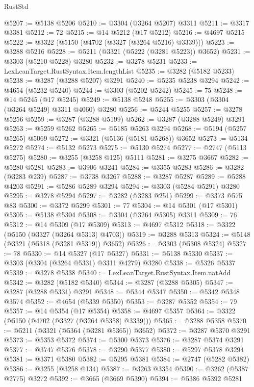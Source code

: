 \begin{lexlean}{RustStd}
\begin{coremodule}
{\begin{coremodule}
{{{{{{{{{{{{{{{{{{{{{{{{{{{{{{{{{@5207 := @5138 @5206
@5210 := @3304 (@3264 @5207) @3311
@5211 := @3317 @3381
@5212 := 72
@5215 := @14 @5212 (@17 @5212)
@5216 := @4697 @5215
@5222 := @3322 (@5150 (@4702 (@3327 (@3264 @5216) @3339)))
@5223 := @3288 @5216
@5228 := @5211 (@3321 (@5222 (@3281 @5223)) @3652)
@5231 := @3303 (@5210 @5228) @3280
@5232 := @3278 @5231
@5233 := LexLeanTarget.RustSyntax.Item.lengthList
@5235 := @3282 (@5182 @5233)
@5238 := @3287 (@3288 @5207) @3291
@5240 := @5235 @5238 @3294
@5242 := @4654 (@5232 @5240)
@5244 := @3303 (@5202 @5242)
@5245 := 75
@5248 := @14 @5245 (@17 @5245)
@5249 := @5138 @5248
@5255 := @3303 (@3304 (@3264 @5249) @3311 @4060) @3280
@5256 := @5244 @5255
@5257 := @3278 @5256
@5259 := @3287 (@3288 @5199)
@5262 := @3287 (@3288 @5249) @3291
@5263 := @5259 @5262
@5265 := @5185 @5263 @3294
@5268 := @5194 (@5257 @5265) @5069
@5272 := @3321 (@5136 (@5181 @5268)) @3652
@5273 := @5134 @5272
@5274 := @5132 @5273
@5275 := @5130 @5274
@5277 := @2747 (@5113 @5275)
@5280 := @3255 (@3258 @125) @5111
@5281 := @3275 @3667
@5282 := @5280 @5281
@5283 := @3906 @3241
@5284 := @3355 @5283
@5286 := @3282 (@3283 @239)
@5287 := @3738 @3267
@5288 := @3287 @5287
@5289 := @5288 @4203
@5291 := @5286 @5289 @3294
@5294 := @3303 (@5284 @5291) @3280
@5295 := @3278 @5294
@5297 := @3282 (@3283 @251)
@5299 := @3373 @575 @83
@5300 := @3372 @5299
@5301 := 77
@5304 := @14 @5301 (@17 @5301)
@5305 := @5138 @5304
@5308 := @3304 (@3264 @5305) @3311
@5309 := 76
@5312 := @14 @5309 (@17 @5309)
@5313 := @4697 @5312
@5318 := @3322 (@5150 (@3327 (@3264 @5313) @4703))
@5319 := @3288 @5313
@5324 := @5148 (@3321 (@5318 (@3281 @5319)) @3652)
@5326 := @3303 (@5308 @5324)
@5327 := 78
@5330 := @14 @5327 (@17 @5327)
@5331 := @5138 @5330
@5337 := @3303 (@3304 (@3264 @5331) @3311 @4279) @3280
@5338 := @5326 @5337
@5339 := @3278 @5338
@5340 := LexLeanTarget.RustSyntax.Item.natAdd
@5342 := @3282 (@5182 @5340)
@5344 := @3287 (@3288 @5305)
@5347 := @3287 (@3288 @5331) @3291
@5348 := @5344 @5347
@5350 := @5342 @5348 @3574
@5352 := @4654 (@5339 @5350)
@5353 := @3287 @5352
@5354 := 79
@5357 := @14 @5354 (@17 @5354)
@5358 := @4697 @5357
@5364 := @3322 (@5150 (@4702 (@3327 (@3264 @5358) @3339)))
@5365 := @3288 @5358
@5370 := @5211 (@3321 (@5364 (@3281 @5365)) @3652)
@5372 := @3287 @5370 @3291
@5373 := @5353 @5372
@5374 := @5300 @5373
@5376 := @3287 @5374 @3291
@5377 := @3747 @5376
@5378 := @3290 @5377
@5380 := @5297 @5378 @3294
@5381 := @3371 @5380
@5382 := @5295 @5381
@5384 := @2747 (@5282 @5382)
@5386 := @3255 (@3258 @134)
@5387 := @3263 @3354
@5390 := @3262 (@5387 @2775) @3272
@5392 := @3665 (@3669 @5390)
@5394 := @5386 @5392 @5281
}}}}}}}}}}}}}}}}}}}}}}}}}}}}}}}}}
\end{coremodule}}
\end{coremodule}
\end{lexlean}
